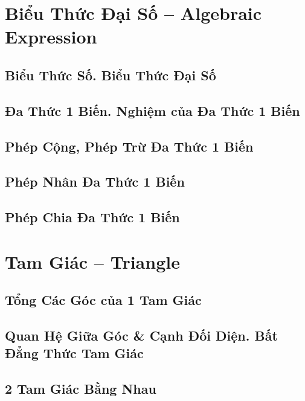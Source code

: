 \documentclass{article}
\numberwithin{equation}{section}
\begin{document}

\section{Biểu Thức Đại Số -- Algebraic Expression}

\subsection{Biểu Thức Số. Biểu Thức Đại Số}

\subsection{Đa Thức 1 Biến. Nghiệm của Đa Thức 1 Biến}

\subsection{Phép Cộng, Phép Trừ Đa Thức 1 Biến}

\subsection{Phép Nhân Đa Thức 1 Biến}

\subsection{Phép Chia Đa Thức 1 Biến}


\section{Tam Giác -- Triangle}

\subsection{Tổng Các Góc của 1 Tam Giác}

\subsection{Quan Hệ Giữa Góc \& Cạnh Đối Diện. Bất Đẳng Thức Tam Giác}

\subsection{2 Tam Giác Bằng Nhau}
\end{document}
